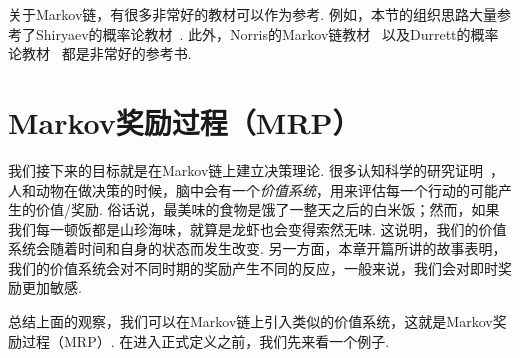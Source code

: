\begin{remark}
    关于Markov链，有很多非常好的教材可以作为参考. 例如，本节的组织思路大量参考了Shiryaev的概率论教材~\cite{shiryaevProbability1996}. 此外，Norris的Markov链教材~\cite{norrisMarkovChains1997} 以及Durrett的概率论教材~\cite{durrettProbabilityTheoryExamples2019} 都是非常好的参考书.
\end{remark}

\section{Markov奖励过程（MRP）}

我们接下来的目标就是在Markov链上建立决策理论. 很多认知科学的研究证明~\cite{gazzanigaCognitiveNeuroscienceBiology2018}，人和动物在做决策的时候，脑中会有一个\textit{价值系统}，用来评估每一个行动的可能产生的价值/奖励. 俗话说，最美味的食物是饿了一整天之后的白米饭；然而，如果我们每一顿饭都是山珍海味，就算是龙虾也会变得索然无味. 这说明，我们的价值系统会随着时间和自身的状态而发生改变. 另一方面，本章开篇所讲的故事表明，我们的价值系统会对不同时期的奖励产生不同的反应，一般来说，我们会对即时奖励更加敏感.

总结上面的观察，我们可以在Markov链上引入类似的价值系统，这就是Markov奖励过程（MRP）. 在进入正式定义之前，我们先来看一个例子.

